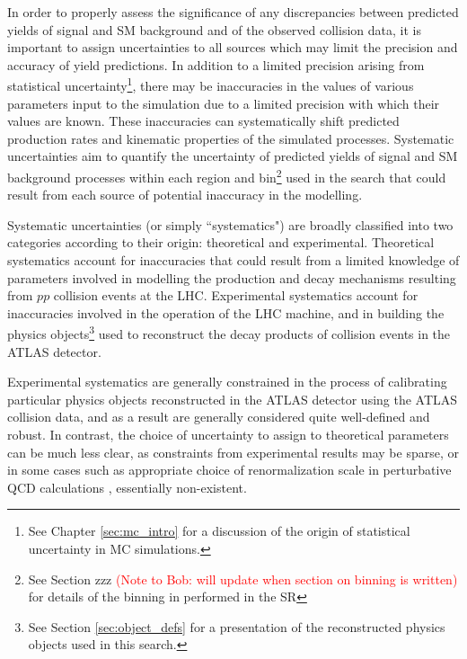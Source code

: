 \label{chapter:systematics}

In order to properly assess the significance of any discrepancies between predicted yields of signal and SM background and of the observed collision data, it is important to assign uncertainties to all sources which may limit the precision and accuracy of yield predictions. In addition to a limited precision arising from statistical uncertainty\footnote{See Chapter \ref{sec:mc_intro} for a discussion of the origin of statistical uncertainty in MC simulations.}, there may be inaccuracies in the values of various parameters input to the simulation due to a limited precision with which their values are known. These inaccuracies can systematically shift predicted production rates and kinematic properties of the simulated processes. Systematic uncertainties aim to quantify the uncertainty of  predicted yields of signal and SM background processes within each region and bin\footnote{See Section zzz \textcolor{red}{(Note to Bob: will update when section on binning is written)} for details of the binning in \minms performed in the SR} used in the search that could result from each source of potential inaccuracy in the modelling. 

Systematic uncertainties (or simply ``systematics") are broadly classified into two categories according to their origin: theoretical and experimental. Theoretical systematics account for inaccuracies that could result from a limited knowledge of parameters involved in modelling the production and decay mechanisms resulting from \(pp\) collision events at the LHC. Experimental systematics account for inaccuracies involved in the operation of the LHC machine, and in building the physics objects\footnote{See Section \ref{sec:object_defs} for a presentation of the reconstructed physics objects used in this search.} used to reconstruct the decay products of collision events in the ATLAS detector. 

Experimental systematics are generally constrained in the process of calibrating particular physics objects reconstructed in the ATLAS detector using the ATLAS collision data, and as a result are generally considered quite well-defined and robust. In contrast, the choice of uncertainty to assign to theoretical parameters can be much less clear, as constraints from experimental results may be sparse, or in some cases such as appropriate choice of renormalization scale in perturbative QCD calculations \cite{PDG_2018}, essentially non-existent. 

